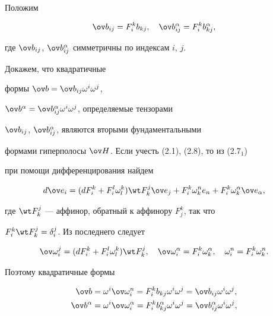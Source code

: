 Положим 


\begin{equation} 


\ov b_{ij}=F^k_i b_{kj},\quad 


\ov b^\alpha_{ij}=F^k_i b^\alpha_{kj}, 


\end{equation} 


где $\ov b_{ij}$, $\ov b^\alpha_{ij}$ симметричны по индексам $i$, $j$. 


Докажем, что квадратичные 


формы $\ov b=\ov b_{ij}\omega^i\omega^j$, 


$\ov b^\alpha=\ov b^\alpha_{ij}\omega^i\omega^j$, определяемые тензорами 


$\ov b_{ij}$, $\ov b^\alpha_{ij}$, являются вторыми фундаментальными 


формами гиперполосы $\ov H$. Если учесть (2.1), (2.8), то из (2.7${}_1$) 


при помощи дифференцирования найдем 


$$ 


d\ov e_i=(dF^k_i+F^l_i\omega^k_l)\wt F^j_k\ov e_j+ 


F^k_i\omega^n_k e_n+ F^k_i\omega^\alpha_k\ov e_\alpha, 


$$ 


где $\wt F^j_k$ --- аффинор, обратный к аффинору $F^k_j$, так что 


$F^k_i\wt F^j_k=\delta^j_i$. Из последнего следует 


\begin{equation} 


\ov\omega^j_i=(dF^k_i+F^l_i\omega^k_l)\wt F^j_k,\quad 


\ov\omega^\alpha_i=F^k_i\omega^\alpha_k,\quad 


\omega^n_i=F^k_i\omega^n_k. 


\end{equation} 


Поэтому квадратичные формы 


\begin{align*} 


\ov b&=\omega^i\ov\omega^n_i=F^k_i b_{kj}\omega^i\omega^j= 


\ov b_{ij}\omega^i\omega^j, \\ 


\ov b^\alpha&=\omega^i\ov\omega^\alpha_i= 


F^k_i b^\alpha_{kj}\omega^i\omega^j=\ov b^\alpha_{ij} 


\omega^i\omega^j, 


\end{align*} 


